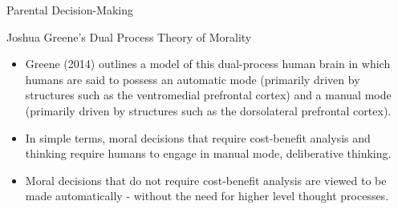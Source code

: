 \documentclass[handout]{beamer}
\begin{document}
\begin{frame}{Parental Decision-Making}

\begin{block}{Joshua Greene's Dual Process Theory of Morality}

\begin{itemize}[<+->]
\itemsep1pt\parskip0pt
\item
  Greene (2014) outlines a model of this dual-process human brain in
  which humans are said to possess an automatic mode (primarily driven
  by structures such as the ventromedial prefrontal cortex) and a manual
  mode (primarily driven by structures such as the dorsolateral
  prefrontal cortex).
\end{itemize}

\begin{itemize}[<+->]
\itemsep1pt\parskip0pt
\item
  In simple terms, moral decisions that require cost-benefit analysis
  and thinking require humans to engage in manual mode, deliberative
  thinking.
\end{itemize}

\begin{itemize}[<+->]
\itemsep1pt\parskip0pt
\item
  Moral decisions that do not require cost-benefit analysis are viewed
  to be made automatically - without the need for higher level thought
  processes.
\end{itemize}

\end{block}

\end{frame}
\end{document}
